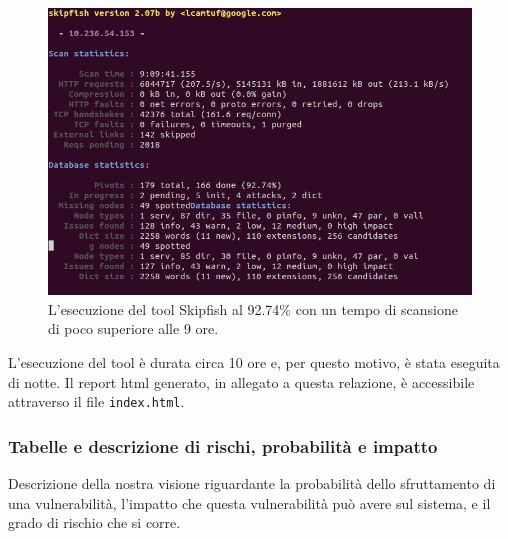 \documentclass{article}
\begin{document}
\begin{itemize}
\begin{figure}[h!]
\centering
\centerline{\includegraphics[scale=0.4,keepaspectratio]{img/skipfish_run}}
\caption{L'esecuzione del tool Skipfish al 92.74\% con un tempo di scansione di poco superiore alle 9 ore.}
\end{figure}

L'esecuzione del tool è durata circa 10 ore e, per questo motivo, è stata eseguita di notte.
Il report html generato, in allegato a questa relazione, è accessibile attraverso il file {\tt index.html}.
\end{itemize}

\subsubsection{Tabelle e descrizione di rischi, probabilità e impatto}
Descrizione della nostra visione riguardante la probabilità dello sfruttamento di una vulnerabilità, l'impatto che questa vulnerabilità può avere sul sistema, e il grado di rischio che si corre.
\end{document}

